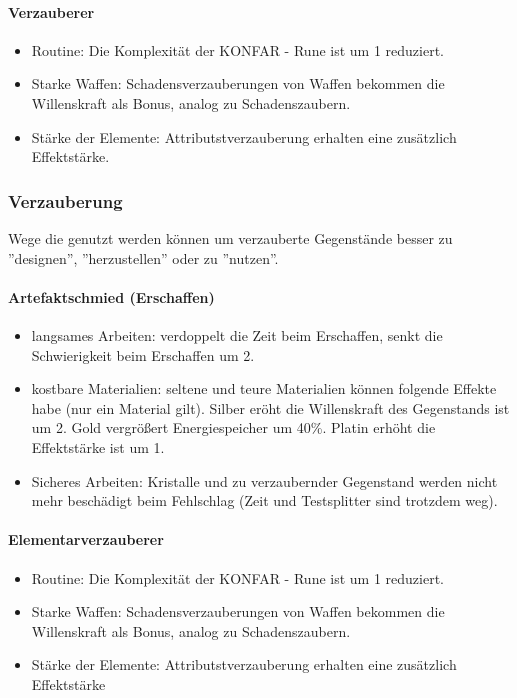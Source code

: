 \documentclass{article}
\begin{document}
\paragraph{Verzauberer}

\begin{itemize}
\item Routine: Die Komplexität der KONFAR - Rune ist um 1 reduziert.
\item Starke Waffen: Schadensverzauberungen von Waffen bekommen die Willenskraft als Bonus, analog zu Schadenszaubern.
\item Stärke der Elemente: Attributstverzauberung erhalten eine zusätzlich Effektstärke.
\end{itemize}

\subsubsection{Verzauberung}

Wege die genutzt werden können um verzauberte Gegenstände besser zu ''designen'', ''herzustellen'' oder zu ''nutzen''.

\paragraph{Artefaktschmied (Erschaffen)}

\begin{itemize}
\item langsames Arbeiten: verdoppelt die Zeit beim Erschaffen, senkt die Schwierigkeit beim Erschaffen um 2.
\item kostbare Materialien: seltene und teure Materialien können folgende Effekte habe (nur ein Material gilt). Silber eröht die Willenskraft des Gegenstands ist um 2. Gold vergrößert Energiespeicher um 40\%. Platin erhöht die Effektstärke ist um 1.
\item Sicheres Arbeiten: Kristalle und zu verzaubernder Gegenstand werden nicht mehr beschädigt beim Fehlschlag (Zeit und Testsplitter sind trotzdem weg).
\end{itemize}

\paragraph{Elementarverzauberer}

\begin{itemize}
\item Routine: Die Komplexität der KONFAR - Rune ist um 1 reduziert.
\item Starke Waffen: Schadensverzauberungen von Waffen bekommen die Willenskraft als Bonus, analog zu Schadenszaubern.
\item Stärke der Elemente: Attributstverzauberung erhalten eine zusätzlich Effektstärke
\end{itemize}
\end{document}
